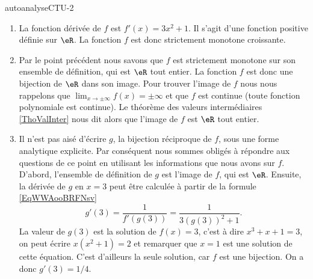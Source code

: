 
\begin{corrige}{autoanalyseCTU-2}


\begin{enumerate}
\item La fonction dérivée de $f$ est  $f'(x) = 3x^2 + 1$. Il s'agit d'une fonction positive définie sur $\eR$. La fonction $f$ est donc strictement monotone croissante. 
\item Par le point précédent nous savons que $f$ est strictement monotone sur son ensemble de définition, qui est $\eR$ tout entier. La fonction $f$ est donc une bijection de $\eR$ dans son image. Pour trouver l'image de $f$ nous nous rappelons que $\lim_{x\to \pm\infty} f(x) = \pm\infty$ et que $f$ est continue (toute fonction polynomiale est continue). Le théorème des valeurs intermédiaires \ref{ThoValInter} nous dit alors que l'image de $f$ est $\eR$ tout entier. 
\item Il n'est pas aisé d'écrire $g$, la bijection réciproque de $f$, sous une forme analytique explicite. Par conséquent nous sommes obligés à répondre aux questions de ce point en utilisant les informations que nous avons sur $f$. D'abord, l'ensemble de définition de $g$ est l'image de $f$, qui est $\eR$. Ensuite, la dérivée de $g$ en $x=3$ peut \^etre calculée à partir de la formule \eqref{EqWWAooBRFNsv} 
  \begin{equation*}
    g'(3) = \frac{1}{f'(g(3))} = \frac{1}{3(g(3))^2 +1}.
  \end{equation*}
La valeur de $g(3)$ est la solution de $f(x) = 3$, c'est à dire $x^3+x+1 = 3$, on peut écrire $x(x^2+1) = 2$ et remarquer que $x=1$ est une solution de cette équation. C'est d'ailleurs la seule solution, car $f$ est une bijection. On a donc $g'(3) = 1/4$.
\end{enumerate}

\end{corrige}   
